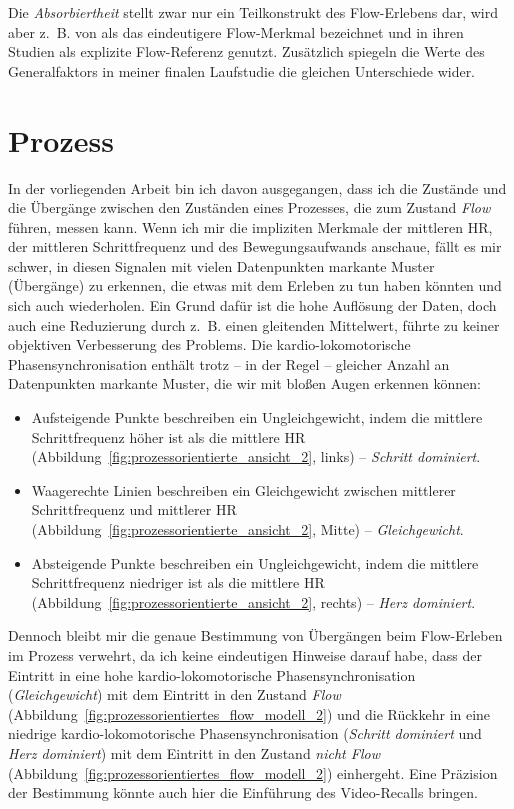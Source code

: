 Die \emph{Absorbiertheit} stellt zwar nur ein Teilkonstrukt des Flow-Erlebens dar, wird aber z.~B. von \citet{Peifer2015} als das eindeutigere Flow-Merkmal bezeichnet und in ihren Studien als explizite Flow-Referenz genutzt. Zusätzlich spiegeln die Werte des Generalfaktors in meiner finalen Laufstudie die gleichen Unterschiede wider. 

\section{Prozess} 

\label{sec:prozess}

In der vorliegenden Arbeit bin ich davon ausgegangen, dass ich die Zustände und die Übergänge zwischen den Zuständen eines Prozesses, die zum Zustand \emph{Flow} führen, messen kann. Wenn ich mir die impliziten Merkmale der mittleren \ac{HR}, der mittleren Schrittfrequenz und des Bewegungsaufwands anschaue, fällt es mir schwer, in diesen Signalen mit vielen Datenpunkten markante Muster (Übergänge) zu erkennen, die etwas mit dem Erleben zu tun haben könnten und sich auch wiederholen. Ein Grund dafür ist die hohe Auflösung der Daten, doch auch eine Reduzierung durch z.~B. einen gleitenden Mittelwert, führte zu keiner objektiven Verbesserung des Problems. Die kardio-lokomotorische Phasensynchronisation enthält trotz -- in der Regel -- gleicher Anzahl an Datenpunkten markante Muster, die wir mit bloßen Augen erkennen können: 
\begin{itemize}
	
	\item Aufsteigende Punkte beschreiben ein Ungleichgewicht, indem die mittlere Schrittfrequenz höher ist als die mittlere \ac{HR} (Abbildung~\ref{fig:prozessorientierte_ansicht_2}, links) -- \emph{Schritt dominiert}.
	
	\item Waagerechte Linien beschreiben ein Gleichgewicht zwischen mittlerer Schrittfrequenz und mittlerer \ac{HR} (Abbildung~\ref{fig:prozessorientierte_ansicht_2}, Mitte) -- \emph{Gleichgewicht}.
	
	\item Absteigende Punkte beschreiben ein Ungleichgewicht, indem die mittlere Schrittfrequenz niedriger ist als die mittlere \ac{HR} (Abbildung~\ref{fig:prozessorientierte_ansicht_2}, rechts) -- \emph{Herz dominiert}. 
\end{itemize}

Dennoch bleibt mir die genaue Bestimmung von Übergängen beim Flow-Erleben im Prozess verwehrt, da ich keine eindeutigen Hinweise darauf habe, dass der Eintritt in eine hohe kardio-lokomotorische Phasensynchronisation (\emph{Gleichgewicht}) mit dem Eintritt in den Zustand \emph{Flow} (Abbildung~\ref{fig:prozessorientiertes_flow_modell_2}) und die Rückkehr in eine niedrige kardio-lokomotorische Phasensynchronisation (\emph{Schritt dominiert} und \emph{Herz dominiert}) mit dem Eintritt in den Zustand \emph{nicht Flow} (Abbildung~\ref{fig:prozessorientiertes_flow_modell_2}) einhergeht. Eine Präzision der Bestimmung könnte auch hier die Einführung des Video-Recalls bringen.

